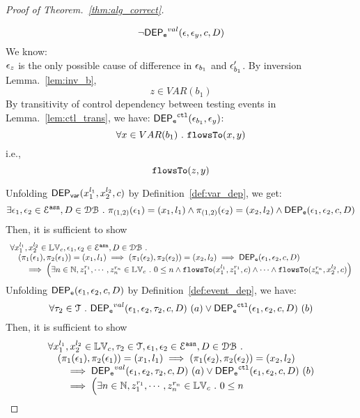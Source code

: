 \begin{proof}[Proof of Theorem.~\ref{thm:alg_correct}]
\begin{case}
\begin{subcase}
\[
  \neg \mathsf{DEP_{\mathtt{e}}}^{val} (\mathtt{\epsilon}, \mathtt{\epsilon}_y, c, D)
\]
%
We know:
\\
%
$\mathtt{\epsilon}_z$ is the only possible cause of difference in $\mathtt{\epsilon}_{b_1}$ and $\mathtt{\epsilon}_{b_1}'$.
%
By inversion Lemma.~\ref{lem:inv_b}, 
\[
  z \in VAR(b_1)
\]
%
%
By transitivity of control dependency between testing events in Lemma.~\ref{lem:ctl_trans},
we have:
 $ \mathsf{DEP_{\mathtt{e}}}^{\mathtt{{ctl}}} (\mathtt{\epsilon}_{b_1}, \mathtt{\epsilon}_y)$:
\[
  \forall x \in VAR(b_1) ~.~ \mathtt{flowsTo}(x, y)
\]
i.e.,
\[
  \mathtt{flowsTo}(z, y)
\]
%
\end{subcase}
%
\end{case}
%
%
Unfolding $\mathsf{DEP_{var}}({x}_1^{l_1}, {x}_2^{l_2}, {c})$ by Definition~\ref{def:var_dep},
we get:
\[
\exists \mathtt{\epsilon}_1, \mathtt{\epsilon}_2 \in \mathcal{E}^{\mathtt{{asn}}}, D \in \mathcal{DB} ~.~
\pi_{(1,2)}{(\mathtt{\epsilon}_1)} = ({x}_1, l_1)
\land
\pi_{(1,2)}{(\mathtt{\epsilon}_2)} = ({x}_2, l_2)
\land 
\mathsf{DEP_{\mathtt{e}}}(\mathtt{\epsilon}_1, \mathtt{\epsilon}_2, c, D)
\]
%
Then, it is sufficient to show
%
\[
\begin{array}{l}
\forall {x}_1^{l_1}, {x}_2^{l_2} \in \mathbb{LV}_{{c}},
 \mathtt{\epsilon}_1, \mathtt{\epsilon}_2 \in \mathcal{E}^{\mathtt{{asn}}}, D \in \mathcal{DB} ~.~
 \\ \quad
(\pi_{1}{(\mathtt{\epsilon}_1)}, \pi_{2}{(\mathtt{\epsilon}_1)}) = ({x}_1, l_1)
\implies
(\pi_{1}{(\mathtt{\epsilon}_2)}, \pi_{2}{(\mathtt{\epsilon}_2)}) = ({x}_2, l_2)
\implies 
\mathsf{DEP_{\mathtt{e}}}(\mathtt{\epsilon}_1, \mathtt{\epsilon}_2, c, D)
 \\ \qquad \implies
   \Big(\exists  n \in \mathbb{N},z_1^{r_1}, \cdots, z_n^{r_n} \in \mathbb{LV}_{{c}} ~.~ 0 \leq n
 \land \mathtt{flowsTo}(x_1^{l_1}, z_1^{r_1}, c) \land \cdots \land \mathtt{flowsTo}(z_n^{r_n}, {x}_2^{l_2}, c) \Big)
\end{array}
\]
%
%
%
%
%
Unfolding $\mathsf{DEP_{\mathtt{e}}}(\mathtt{\epsilon}_1, \mathtt{\epsilon}_2, c, D)$ by Definition~\ref{def:event_dep}, we have:
\[
\forall \mathtt{\tau}_2 \in \mathcal{T} ~.~
\mathsf{DEP_{\mathtt{e}}}^{val}(\mathtt{\epsilon}_1, \mathtt{\epsilon}_2, \mathtt{\tau}_2, c, D) ~ (a) 
\lor
\mathsf{DEP_{\mathtt{e}}}^{\mathtt{{ctl}}}(\mathtt{\epsilon}_1, \mathtt{\epsilon}_2, c, D) ~ (b)
\]
%
Then, it is sufficient to show
%
\[
\begin{array}{l}
\forall {x}_1^{l_1}, {x}_2^{l_2} \in \mathbb{LV}_{{c}}, \mathtt{\tau}_2 \in \mathcal{T}, 
\mathtt{\epsilon}_1, \mathtt{\epsilon}_2 \in \mathcal{E}^{\mathtt{{asn}}}, D \in \mathcal{DB} ~.~
\\ \quad
(\pi_{1}{(\mathtt{\epsilon}_1)}, \pi_{2}{(\mathtt{\epsilon}_1)}) = ({x}_1, l_1)
\implies
(\pi_{1}{(\mathtt{\epsilon}_2)}, \pi_{2}{(\mathtt{\epsilon}_2)}) = ({x}_2, l_2)
 \\ \qquad \implies 
\mathsf{DEP_{\mathtt{e}}}^{val}(\mathtt{\epsilon}_1, \mathtt{\epsilon}_2, \mathtt{\tau}_2, c, D) ~ (a)
\lor
\mathsf{DEP_{\mathtt{e}}}^{\mathtt{{ctl}}}(\mathtt{\epsilon}_1, \mathtt{\epsilon}_2, c, D)  ~ (b)
 \\ \qquad \implies
   \Big(\exists  n \in \mathbb{N}, z_1^{r_1}, \cdots, z_n^{r_n} \in \mathbb{LV}_{{c}} ~.~ 0 \leq n

\end{array}\]
\end{proof}
